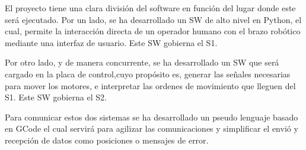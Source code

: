 El proyecto tiene una clara división del software en función del lugar donde este será ejecutado. Por un lado, se ha desarrollado un \ac{SW} de alto nivel en Python, el cual, permite la interacción directa de un operador humano con el brazo robótico mediante una interfaz de usuario. Este \ac{SW} gobierna el \ac{S1}. 

Por otro lado, y de manera concurrente, se ha desarrollado un \ac{SW} que será cargado en la placa de control,cuyo propósito es, generar las señales necesarias para mover los motores, e interpretar las ordenes de movimiento que lleguen del \ac{S1}. Este \ac{SW} gobierna el \ac{S2}.

Para comunicar estos dos sistemas se ha desarrollado un pseudo lenguaje basado en GCode el cual servirá para agilizar las comunicaciones y simplificar el envió y recepción de datos como posiciones o mensajes de error.